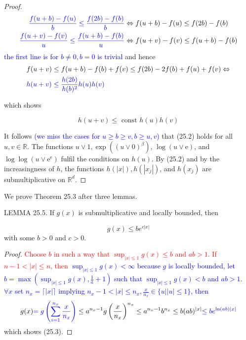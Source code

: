 \documentclass[a4paper,11pt]{article}
\begin{document}
\begin{proof}
    $$
        \begin{aligned}
            \textcolor{blue}{\frac{f(u+b)-f(u)}{b}  \leq \frac{f(2 b)-f(b)}{b}} & \Leftrightarrow f(u+b)-f(u)  \le f(2 b)-f(b) \\
            \textcolor{blue}{\frac{f(u+v)-f(v)}{u}  \leq \frac{f(u+b)-f(b)}{u}} & \Leftrightarrow f(u+v)-f(v)  \le f(u+b)-f(b)
        \end{aligned}
    $$
    \textcolor{blue}{ the first line is for $b \neq 0, b = 0$ is trivial }
    and hence
    \begin{align*}
         & f(u+v)                   \leq f(u+b)-f(b)+f(v) \leq f(2 b)-2 f(b)+f(u)+f(v) \Leftrightarrow \\
         & \textcolor{blue}{h(u+v)  \le \frac{h(2b)}{h(b)^{2}} h(u) h(v)}
    \end{align*}

    which shows

    \begin{equation*}
        h(u+v) \leq \text { const } h(u) h(v) \tag{25.2}
    \end{equation*}


    It follows \textcolor{blue}{(we miss the cases for $u \ge b \ge v, b \ge u,v $)} that (25.2) holds for all $u, v \in \mathbb{R}$. The functions
    $u \vee 1, \exp \left((u \vee 0)^{\beta}\right)$, $\log (u \vee \mathrm{e})$, and
    $\log \log \left(u \vee \mathrm{e}^{\mathrm{e}}\right)$ fulfil the conditions on
    $h(u)$. By (25.2) and by the increasingness of $h$, the functions $h(|x|), h\left(\left|x_{j}\right|\right)$, and
    $h\left(x_{j}\right)$ are submultiplicative on $\mathbb{R}^{d}$.

\end{proof}

We prove Theorem 25.3 after three lemmas.

LEMMA 25.5. If $g(x)$ is submultiplicative and locally bounded, then

\begin{equation*}
    g(x) \leq b e^{c|x|} \tag{25.3}
\end{equation*}
with some $b>0$ and $c>0$.

\begin{proof}
    \textcolor{red}{
        Choose $b$ in such a way that $\sup _{|x| \leq 1} g(x) \leq b$ and $a b>1$. If $n-1<|x| \leq n$,
        then
    }
    \textcolor{blue}{
        $\sup _{|x| \leq 1} g(x) < \infty$ because $g$ is locally bounded, let $b = \max(\sup _{|x| \leq 1} g(x),\frac{1}{a}+1)$ such that $\sup _{|x| \leq 1} g(x)<b$ and $ab>1$.
        $\forall x$ set $n_x = \lceil \left| x \right| \rceil$ implying $n_x-1 < \left| x \right| \leq n_x, \frac{x}{n_x} \in \{u | |u| \leq 1\} $, then
    }
    $$
        g(x)
        \textcolor{blue}{
            = g\left(\sum_{i=1}^{n_x} \frac{x}{n_x}\right)
        }
        \leq a^{n_x-1} g\left(\frac{x}{n_x} \right)^{n_x} \leq a^{n_x-1} b^{n_x} \leq b(a b)^{|x|}
        \textcolor{blue}{
            \le b e^{\ln \left(ab\right)|x|}
        }
    $$
    which shows (25.3).
\end{proof}
\end{document}
